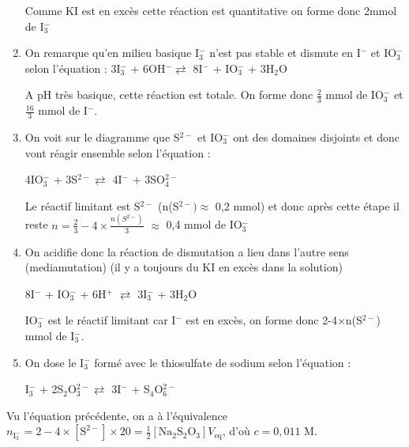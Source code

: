 \begin{solution}
\begin{questions}
\begin{enumerate}
    Comme KI est en excès cette réaction est quantitative on forme donc 2mmol de I$_3^-$
    
    \item On remarque qu'en milieu basique I$_3^-$ n'est pas stable et dismute en I$^-$ et IO$_3^-$ selon l'équation : 
    3I$_3^-$ + 6OH$^- \rightleftarrows$ 8I$^-$ + IO$_3^-$ + 3H$_2$O 
    
    A pH très basique, cette réaction est totale. On forme donc $\frac{2}{3}$ mmol de IO$_3^-$ et $\frac{16}{3}$ mmol de I$^-$. 
    
    \item On voit sur le diagramme que S$^{2-}$ et IO$_3^-$ ont des domaines disjoints et donc vont réagir ensemble selon l'équation : 
    
    4IO$_3^-$ + 3S$^{2-} \rightleftarrows$ 4I$^-$ + 3SO$_4^{2-}$ 
    
    Le réactif limitant est S$^{2-}$ (n(S$^{2-}) \approx$ 0,2 mmol) et donc après cette étape il reste $n = \frac{2}{3}-4\times\frac{n(S^{2-})}{3}$ $\approx$ 0,4 mmol de IO$_3^-$
    
    \item On acidifie donc la réaction de dismutation a lieu dans l'autre sens (mediamutation) (il y a toujours du KI en excès dans la solution) 
    
    8I$^-$ + IO$_3^-$ + 6H$^+$ $\rightleftarrows$ 3I$_3^-$ + 3H$_2$O
    
    IO$_3^-$ est le réactif limitant car I$^-$ est en excès, on forme donc 2-4$\times$n(S$^{2-}$) mmol de I$_3^-$.
    
    \item On dose le I$_3^-$ formé avec le thiosulfate de sodium selon l'équation :
    
    I$_3^-$ + 2S$_2$O$_3^{2-} \rightleftarrows$ 3I$^-$ + S$_4$O$_6^{2-}$ 

    \end{enumerate}
    
    \question Vu l'équation précédente, on a à l'équivalence $n_\mathrm{I_3^-} = 2-4\times [\text{S}^{2-}]\times 20 = \frac{1}{2} \mathrm{[Na_2S_2O_3]} V_\text{eq}$, d'où $c = 0,011$ M.

\end{questions}


\end{solution}
